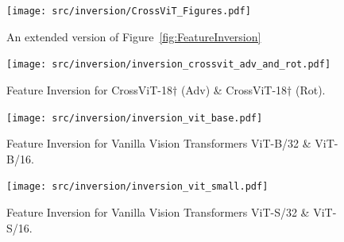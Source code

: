 \documentclass{article} %
\begin{document}
\newpage
\begin{figure}[!t]\centering
\texttt{[image: src/inversion/CrossViT\_Figures.pdf]}
\caption{An extended version of Figure~\ref{fig:FeatureInversion}}
\label{fig:FeatureInversionFull}
\end{figure}
\clearpage

\begin{figure}[!t]\centering
\texttt{[image: src/inversion/inversion\_crossvit\_adv\_and\_rot.pdf]}
\caption{Feature Inversion for CrossViT-18$\dagger$ (Adv) \& CrossViT-18$\dagger$ (Rot).}
\label{fig:FeatureInversionCrossViT18-adv-rot}
\end{figure}
\clearpage

\begin{figure}[!h]\centering
\texttt{[image: src/inversion/inversion\_vit\_base.pdf]}
\caption{Feature Inversion for Vanilla Vision Transformers ViT-B/32 \& ViT-B/16.}
\label{fig:FeatureInversionViT-Base}
\end{figure}
\clearpage

\begin{figure}[!h]\centering
\texttt{[image: src/inversion/inversion\_vit\_small.pdf]}
\caption{Feature Inversion for Vanilla Vision Transformers ViT-S/32 \& ViT-S/16.}
\label{fig:FeatureInversionViT-Small}
\end{figure}
\clearpage









\end{document}
